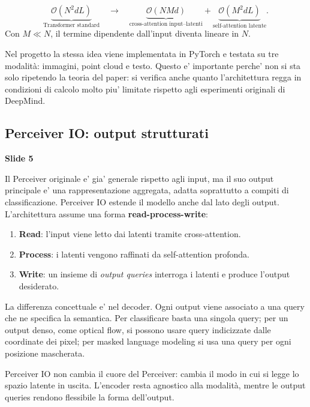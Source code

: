 \documentclass[11pt,a4paper]{article}
\newcommand{\bigO}{\mathcal{O}}
\newcommand{\slide}[1]{\textcolor{mainblue}{\textbf{Slide #1}}}
\begin{document}
\begin{formulaBox}[title={Complessit\`a del Perceiver}]
\[
  \underbrace{\bigO(N^2 d L)}_{\text{Transformer standard}}
  \quad \longrightarrow \quad
  \underbrace{\bigO(NM d)}_{\text{cross-attention input--latenti}}
  +
  \underbrace{\bigO(M^2 d L)}_{\text{self-attention latente}}.
\]
Con $M \ll N$, il termine dipendente dall'input diventa lineare in $N$.
\end{formulaBox}

Nel progetto la stessa idea viene implementata in PyTorch e testata su tre
modalit\`a: immagini, point cloud e testo. Questo e' importante perche' non si
sta solo ripetendo la teoria del paper: si verifica anche quanto l'architettura
regga in condizioni di calcolo molto piu' limitate rispetto agli esperimenti
originali di DeepMind.

\subsection{Perceiver IO: output strutturati}
\slide{5}

Il Perceiver originale e' gia' generale rispetto agli input, ma il suo output
principale e' una rappresentazione aggregata, adatta soprattutto a compiti di
classificazione. Perceiver IO \cite{jaegle2022perceiverio} estende il modello
anche dal lato degli output. L'architettura assume una forma
\textbf{read-process-write}:
\begin{enumerate}
  \item \textbf{Read}: l'input viene letto dai latenti tramite cross-attention.
  \item \textbf{Process}: i latenti vengono raffinati da self-attention profonda.
  \item \textbf{Write}: un insieme di \emph{output queries} interroga i latenti
  e produce l'output desiderato.
\end{enumerate}

La differenza concettuale e' nel decoder. Ogni output viene associato a una
query che ne specifica la semantica. Per classificare basta una singola query;
per un output denso, come optical flow, si possono usare query indicizzate dalle
coordinate dei pixel; per masked language modeling si usa una query per ogni
posizione mascherata.

\begin{takeawaybox}
Perceiver IO non cambia il cuore del Perceiver: cambia il modo in cui si legge
lo spazio latente in uscita. L'encoder resta agnostico alla modalit\`a, mentre
le output queries rendono flessibile la forma dell'output.
\end{takeawaybox}
\end{document}
